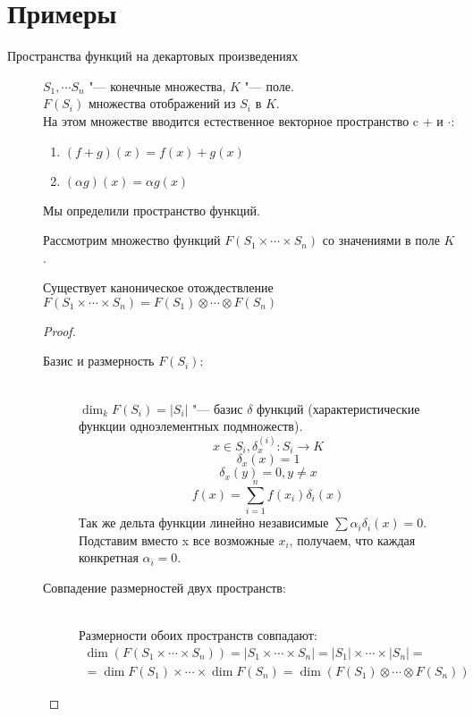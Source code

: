 ﻿\section{Примеры}
\begin{description}
\item [Пространства функций на декартовых произведениях] 
    \begin{Def}
    $S_1, \cdots S_n$ "--- конечные множества, $K$ "--- поле.\\ 
    $F(S_i)$ множества отображений из $S_i$ в $K$.\\
   
    На этом множестве вводится естественное векторное пространство c + и $\cdot$:
    \begin{enumerate}
    \item $(f + g)(x) = f(x) + g(x)$\\
    \item $(\alpha g)(x) = \alpha g(x)$\\ 
    \end{enumerate}

    Мы определили пространство функций.
    \end{Def}
     
    Рассмотрим множество функций $F(S_1 \times \cdots \times S_n)$ со значениями в поле $K$.
   
    \begin{lemma}
    Существует каноническое отождествление 
    $F(S_1 \times \cdots \times S_n) = F(S_1) \otimes \cdots \otimes F(S_n)$
    \end{lemma}
    \begin{proof}
    \begin{description}
    \item[Базис и размерность $F(S_i)$:] \hfill \\
    $\dim_k F(S_i) = |S_i|$ "--- базис $\delta$ функций (характеристические функции одноэлементных подмножеств).
    $$x \in S_i, \delta_{x}^{(i)} \colon S_i \to K$$
    $$\delta_{x}(x) = 1$$
    $$\delta_{x}(y) = 0, y \ne x$$    
    $$f(x) = \sum_{i = 1}^{n}f(x_i)\delta_i(x)$$
    Так же дельта функции линейно независимые $\sum \alpha_i \delta_i(x) = 0$.
    Подставим вместо x все возможные $x_i$, получаем, что каждая конкретная $\alpha_i = 0$.                                         

    \item[Совпадение размерностей двух пространств:] \hfill \\
     Размерности обоих пространств совпадают: 
    \begin{gather*}
    \dim(F(S_1 \times \cdots \times S_n)) = |S_1 \times \cdots \times S_n| = 
    |S_1| \times \cdots \times |S_n| = \\
    = \dim F(S_1) \times \cdots \times \dim F(S_n) 
    = \dim (F(S_1) \otimes \cdots \otimes F(S_n))
    \end{gather*}


\end{description}
\end{proof}
\end{description}
